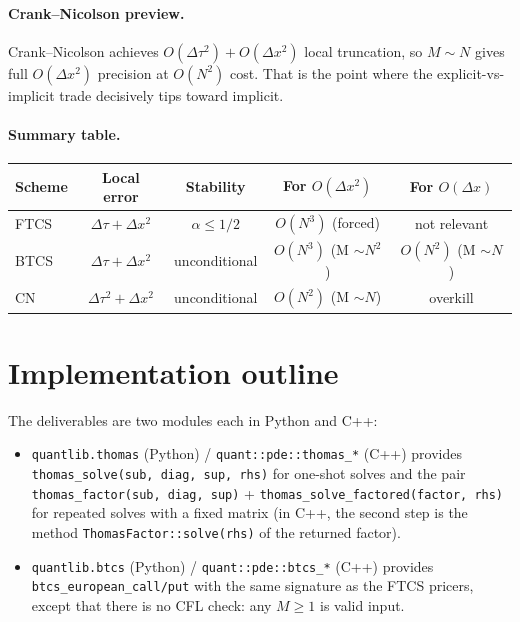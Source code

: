\documentclass[11pt,a4paper]{article}
\begin{document}
\paragraph{Crank--Nicolson preview.} Crank--Nicolson achieves
$O(\Delta\tau^2) + O(\Delta x^2)$ local truncation, so $M \sim N$
gives full $O(\Delta x^2)$ precision at $O(N^2)$ cost. That is the
point where the explicit-vs-implicit trade decisively tips toward
implicit.

\paragraph{Summary table.}
\begin{center}
\begin{tabular}{lcccc}
\hline
Scheme & Local error & Stability & For $O(\Delta x^2)$ & For $O(\Delta x)$ \\
\hline
FTCS  & $\Delta\tau + \Delta x^2$  & $\alpha \le 1/2$       & $O(N^3)$ (forced) & not relevant \\
BTCS  & $\Delta\tau + \Delta x^2$  & unconditional          & $O(N^3)$ (M $\sim N^2$) & $O(N^2)$ (M $\sim N$) \\
CN    & $\Delta\tau^2 + \Delta x^2$ & unconditional         & $O(N^2)$ (M $\sim N$) & overkill \\
\hline
\end{tabular}
\end{center}

\section{Implementation outline}

The deliverables are two modules each in Python and C++:

\begin{itemize}[leftmargin=2em]
\item \texttt{quantlib.thomas} (Python) / \texttt{quant::pde::thomas\_*}
(C++) provides
\texttt{thomas\_solve(sub, diag, sup, rhs)} for one-shot solves and
the pair \texttt{thomas\_factor(sub, diag, sup)} +
\texttt{thomas\_solve\_factored(factor, rhs)} for repeated solves
with a fixed matrix (in C++, the second step is the method
\texttt{ThomasFactor::solve(rhs)} of the returned factor).
\item \texttt{quantlib.btcs} (Python) / \texttt{quant::pde::btcs\_*}
(C++) provides \texttt{btcs\_european\_call/put} with the same
signature as the FTCS pricers, except that there is no CFL check:
any $M \ge 1$ is valid input.
\end{itemize}
\end{document}
